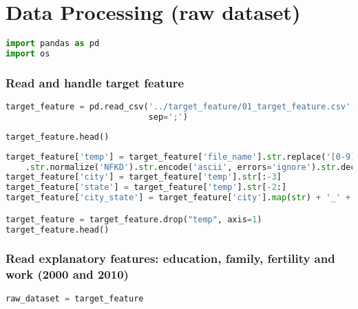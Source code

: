 
\label{ape:data_processing_raw_dataset}
\hypertarget{data-processing-raw-dataset}{%
\section{Data Processing (raw
dataset)}\label{data-processing-raw-dataset}}

\begin{lstlisting}[language=Python]
import pandas as pd
import os
\end{lstlisting}

\hypertarget{read-and-handle-target-feature}{%
\subsubsection{Read and handle target
feature}\label{read-and-handle-target-feature}}

\begin{lstlisting}[language=Python]
target_feature = pd.read_csv('../target_feature/01_target_feature.csv',
                             sep=';')
\end{lstlisting}

\begin{lstlisting}[language=Python]
target_feature.head()
\end{lstlisting}

\begin{lstlisting}[language=Python]
target_feature['temp'] = target_feature['file_name'].str.replace('[0-9]|.pdf|-', ' ', regex=True)\
    .str.normalize('NFKD').str.encode('ascii', errors='ignore').str.decode('utf-8').str.lower().str.strip()
target_feature['city'] = target_feature['temp'].str[:-3]
target_feature['state'] = target_feature['temp'].str[-2:]
target_feature['city_state'] = target_feature['city'].map(str) + '_' + target_feature['state']

target_feature = target_feature.drop("temp", axis=1)
target_feature.head()
\end{lstlisting}

\hypertarget{read-explanatory-features-education-family-fertility-and-work-2000-and-2010}{%
\subsubsection{Read explanatory features: education, family, fertility
and work (2000 and
2010)}\label{read-explanatory-features-education-family-fertility-and-work-2000-and-2010}}

\begin{lstlisting}[language=Python]
raw_dataset = target_feature
\end{lstlisting}


